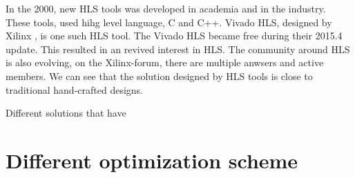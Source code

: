 In the 2000, new HLS tools was developed in academia and in the industry. These tools, used hihg level language, C and C++. Vivado HLS, designed by Xilinx \citep{6409453}, is one such HLS tool. The Vivado HLS became free during their 2015.4 update\citep{VIVADOHLS}. This resulted in an revived interest in HLS. The community around HLS is also evolving, on the Xilinx-forum, there are multiple anwsers and active members. We can see that the solution designed by HLS tools is close to traditional hand-crafted designs\citep{6718388}.

Different solutions that have 

\section{Different optimization scheme}

 